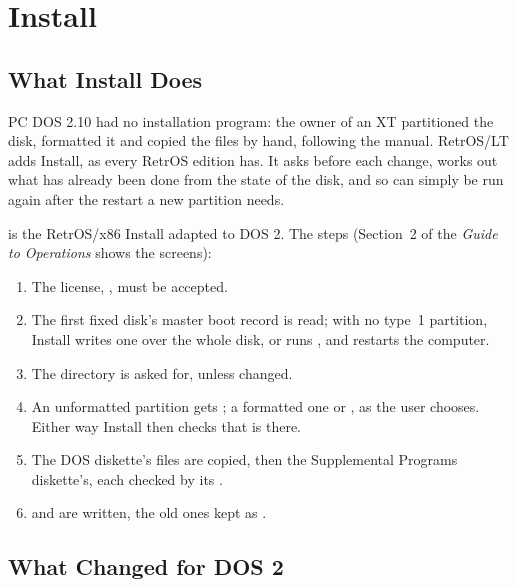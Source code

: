 \mwnewpart
\renewcommand\runningtitle{Section 6. Install}
\chapter{Install}
\sectioncontents

\section{What Install Does}

\begin{plainwords}
PC DOS 2.10 had no installation program: the owner of an XT partitioned
the disk, formatted it and copied the files by hand, following the
manual. RetrOS/LT adds Install, as every RetrOS edition has. It asks
before each change, works out what has already been done from the state
of the disk, and so can simply be run again after the restart a new
partition needs.
\end{plainwords}

 is the RetrOS/x86 Install adapted to DOS 2.
The steps (Section~2 of the \textit{Guide to Operations} shows the
screens):

\begin{enumerate}
\item The license, , must be accepted.
\item The first fixed disk's master boot record is read; with no type~1
  partition, Install writes one over the whole disk, or runs
  , and restarts the computer.
\item The directory is asked for,  unless changed.
\item An unformatted partition gets ; a formatted one
   or , as the user chooses. Either way
  Install then checks that  is there.
\item The DOS diskette's files are copied, then the Supplemental Programs
  diskette's, each checked by its .
\item {} and  are written, the old ones
  kept as .
\end{enumerate}

\section{What Changed for DOS 2}

